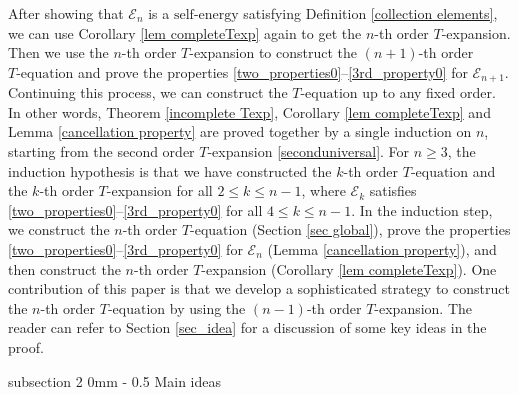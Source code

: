 \documentclass{article}
\makeatletter
\newcommand{\1}{\mathds{1}}
\numberwithin{equation}{section}
\newcommand{\fb}{{\mathfrak b}}
\renewcommand{\leq}{\leqslant}
\renewcommand{\geq}{\geqslant}
\renewcommand{\le}{\leq}
\renewcommand{\ge}{\geq}
\newcommand{\self}{\text{self-energy}}
\theoremstyle{plain} %
\theoremstyle{remark}
\newcommand{\Sele}{{\mathcal E}}
\newcommand{\incomp}{{\text{$T$-equation}}}
\renewcommand{\subsection}{\@startsection
	{subsection}%
	{2}%
	{0mm}%
	{-\baselineskip}%
	{0.5\baselineskip}%
	{\normalfont\bf\itshape}} %
\makeatother
\begin{document}
After showing that $ \Sele_{n} $ is a $\self$ satisfying Definition \ref{collection elements}, we can use Corollary \ref{lem completeTexp}
again to get the $n$-th order $T$-expansion. Then we use the $n$-th order $T$-expansion to construct the $(n+1)$-th order $\incomp$ and prove the properties \eqref{two_properties0}--\eqref{3rd_property0} for $\Sele_{n+1}$. Continuing this process, we can construct the $\incomp$ up to any fixed order. In other words, Theorem \ref{incomplete Texp}, Corollary \ref{lem completeTexp} and Lemma \ref{cancellation property} are proved together by a single induction on $n$, starting from the second order $T$-expansion \eqref{seconduniversal}. For $n\ge 3$, the induction hypothesis is that we have constructed the $k$-th order $\incomp$ and the $k$-th order $T$-expansion for all $2\le k\le n-1$, where $\Sele_k$ satisfies \eqref{two_properties0}--\eqref{3rd_property0} for all $4\le k\le n-1$. In the induction step, we construct the $n$-th order $\incomp$ (Section \ref{sec global}), prove the properties \eqref{two_properties0}--\eqref{3rd_property0} for $\Sele_n$ (Lemma \ref{cancellation property}), and then construct the $n$-th order $T$-expansion (Corollary \ref{lem completeTexp}). One contribution of this paper is that we develop a sophisticated strategy to construct the $n$-th order $\incomp$ by using the $(n-1)$-th order $T$-expansion. The reader can refer to Section \ref{sec_idea} for a discussion of some key ideas in the proof. 



\subsection{Main ideas}\label{sec_idea}
\end{document}
